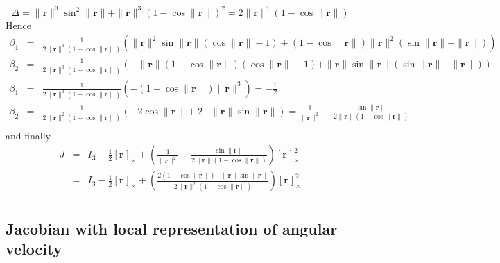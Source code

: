 \documentclass {article}
\newcommand\rot{\mathbf{r}}
\newcommand\rcross[1]{[\rot_{#1}]_{\times}}
\newcommand\normr{\|\rot\|}
\begin{document}
$$
\Delta = \normr^3\sin^2\normr + \normr^3 (1-\cos\normr)^2 = 2\normr^3(1 -\cos\normr)
$$
Hence
\begin{eqnarray*}
\beta_1 &=& \frac{1}{2\normr^3(1 -\cos\normr)}\left(\normr^2\sin\normr (\cos \normr - 1) + (1 - \cos \normr)\normr^2(\sin\normr - \normr)\right) \\
\beta_2 &=& \frac{1}{2\normr^3(1 -\cos\normr)}\left(-\normr(1 - \cos \normr)(\cos \normr - 1) + \normr\sin\normr(\sin\normr - \normr)\right)\\
\beta_1 &=& \frac{1}{2\normr^3(1 -\cos\normr)}\left(-(1 - \cos \normr)\normr^3\right) = -\frac{1}{2}\\
\beta_2 &=& \frac{1}{2\normr^2(1 -\cos\normr)}\left(-2\cos \normr + 2 - \normr\sin\normr\right) = \frac{1}{\normr^2} - \frac{\sin\normr}{2\normr(1-\cos\normr)}\\
\end{eqnarray*}
and finally
\begin{eqnarray}
\label{eq:J-1}
J &=& I_3 -\frac{1}{2}\rcross{} +  \left(\frac{1}{\normr^2} - \frac{\sin\normr}{2\normr(1-\cos\normr)}\right)\rcross{}^2\\
\label{eq:J-2}
&=& I_3 -\frac{1}{2}\rcross{} +  \left(\frac{2(1-\cos\normr) - \normr\sin\normr}{2\normr^2(1-\cos\normr)}\right)\rcross{}^2\\
\end{eqnarray}

\subsection {Jacobian with local representation of angular velocity}
\end{document}
